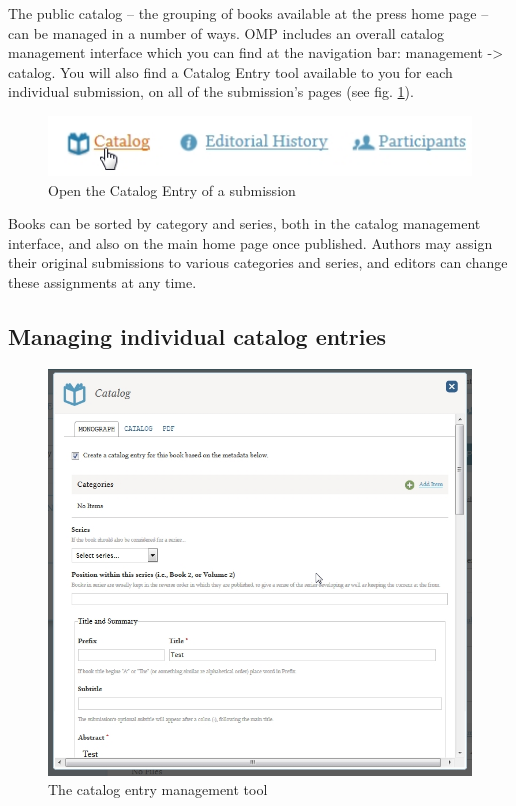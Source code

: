 The public catalog -- the grouping of books available at the press home page -- can be managed in a number of ways. OMP includes an overall catalog management interface which you can find at the navigation bar: management -> catalog. You will also find a Catalog Entry tool available to you for each individual submission, on all of the submission's pages (see fig. \ref{fig:catalog}).

\begin{figure}[h] \centering
\includegraphics[width=1\textwidth]{./img/catalog.jpg} \caption{Open the Catalog Entry of a submission}
\label{fig:catalog}
\end{figure}

Books can be sorted by category and series, both in the catalog management interface, and also on the main home page once published. Authors may assign their original submissions to various categories and series, and editors can change these assignments at any time. 

\subsection*{Managing individual catalog entries}

\begin{figure}[h] \centering
\includegraphics[width=1\textwidth]{./img/metadata.jpg} \caption{The catalog entry management tool}
\label{fig:metadata}
\end{figure}

